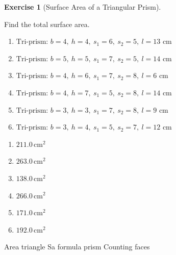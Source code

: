 \documentclass[
  letterpaper,
  DIV=11,
  numbers=noendperiod]{scrreprt}
\theoremstyle{definition}
\newtheorem{exercise}{Exercise}[chapter]
\theoremstyle{remark}
\begin{document}
\begin{exercise}[Surface Area of a Triangular
Prism]\protect\hypertarget{exr-sa-3}{}\label{exr-sa-3}

Find the total surface area.

\begin{enumerate}
\def\labelenumi{\alph{enumi})}
\item
  \(\text{Tri-prism: }b=4,\ h=4,\ s_1=6,\ s_2=5,\ l=13\text{ cm}\)
\item
  \(\text{Tri-prism: }b=5,\ h=5,\ s_1=7,\ s_2=5,\ l=14\text{ cm}\)
\item
  \(\text{Tri-prism: }b=4,\ h=6,\ s_1=7,\ s_2=8,\ l=6\text{ cm}\)
\item
  \(\text{Tri-prism: }b=4,\ h=7,\ s_1=5,\ s_2=8,\ l=14\text{ cm}\)
\item
  \(\text{Tri-prism: }b=3,\ h=3,\ s_1=7,\ s_2=8,\ l=9\text{ cm}\)
\item
  \(\text{Tri-prism: }b=3,\ h=4,\ s_1=5,\ s_2=7,\ l=12\text{ cm}\)
\end{enumerate}

\begin{tcolorbox}[enhanced jigsaw, opacitybacktitle=0.6, coltitle=black, arc=.35mm, colframe=quarto-callout-tip-color-frame, colback=white, bottomrule=.15mm, left=2mm, colbacktitle=quarto-callout-tip-color!10!white, titlerule=0mm, opacityback=0, title=\textcolor{quarto-callout-tip-color}{\faLightbulb}\hspace{0.5em}{🔍 View Solution}, leftrule=.75mm, breakable, rightrule=.15mm, bottomtitle=1mm, toptitle=1mm, toprule=.15mm]

\begin{enumerate}
\def\labelenumi{\alph{enumi})}
\item
  \(211.0\,\text{cm}^{2}\)
\item
  \(263.0\,\text{cm}^{2}\)
\item
  \(138.0\,\text{cm}^{2}\)
\item
  \(266.0\,\text{cm}^{2}\)
\item
  \(171.0\,\text{cm}^{2}\)
\item
  \(192.0\,\text{cm}^{2}\)
\end{enumerate}

\end{tcolorbox}

{Area triangle} {Sa formula prism} {Counting faces}

\end{exercise}
\end{document}
